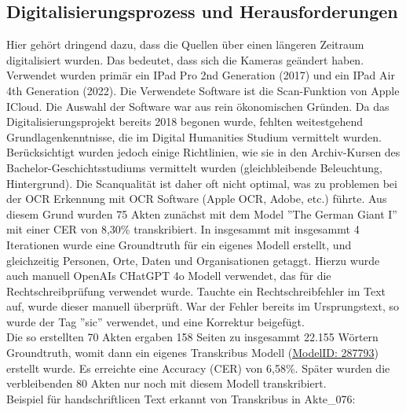 \documentclass[12pt, a4paper, ngerman, bidi=default]{article}
\begin{document}
\subsection{Digitalisierungsprozess und Herausforderungen}
    Hier gehört dringend dazu, dass die Quellen über einen längeren Zeitraum digitalisiert wurden. Das bedeutet, dass sich die Kameras geändert haben. 
    Verwendet wurden primär ein IPad Pro 2nd Generation (2017) und ein IPad Air 4th Generation (2022). Die Verwendete Software ist die Scan-Funktion von Apple ICloud. 
    Die Auswahl der Software war aus rein ökonomischen Gründen. Da das Digitalisierungsprojekt bereits 2018 begonen wurde, fehlten weitestgehend Grundlagenkenntnisse, 
    die im Digital Humanities Studium vermittelt wurden. Berücksichtigt wurden jedoch einige Richtlinien, wie sie in den Archiv-Kursen des Bachelor-Geschichtsstudiums vermittelt wurden 
    (gleichbleibende Beleuchtung, Hintergrund). Die Scanqualität ist daher oft nicht optimal, was zu problemen bei der OCR Erkennung mit OCR Software (Apple OCR, Adobe, etc.) führte. 
    Aus diesem Grund wurden 75 Akten zunächst mit dem Model ”The German Giant I” mit einer CER von 8,30\% transkribiert. In insgesammt  mit insgesammt  4 Iterationen wurde eine Groundtruth 
    für ein eigenes Modell erstellt, und gleichzeitig Personen, Orte, Daten und Organisationen getaggt. Hierzu wurde auch manuell OpenAIs CHatGPT 4o Modell verwendet, das für die 
    Rechtschreibprüfung verwendet wurde. Tauchte ein Rechtschreibfehler im Text auf, wurde dieser manuell überprüft. War der Fehler bereits im Ursprungstext, so wurde der Tag ”sic” verwendet,
    und eine Korrektur beigefügt.\\
    Die so erstellten 70 Akten ergaben 158 Seiten zu insgesammt 22.155 Wörtern Groundtruth, womit dann ein eigenes Transkribus Modell 
    (\href{https://app.transkribus.org/models/public/287793}{ModelID: 287793}) erstellt wurde. Es erreichte eine Accuracy (CER) von 6,58\%. Später wurden die verbleibenden 80 Akten nur noch 
    mit diesem Modell transkribiert. \\
  
    Beispiel für handschriftlicen Text erkannt von Transkribus in Akte\_076: \\
\end{document}
